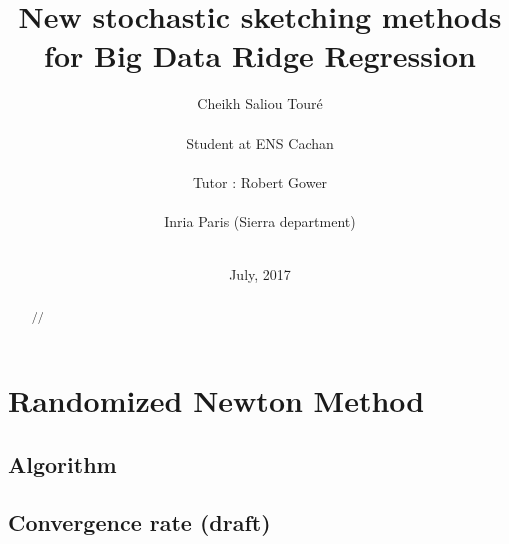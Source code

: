 




\title{New stochastic sketching methods for Big Data Ridge Regression}
\author{Cheikh Saliou Tour\'e \\ \\
Student at ENS Cachan\\\\
Tutor : Robert Gower \\ \\
Inria Paris (Sierra department)\\\\ }




\date{July, 2017}




\renewcommand\bibname{References}
\maketitle


\begin{abstract}

//

\end{abstract}
\tableofcontents
\newpage

\chapter{Randomized Newton Method}

%
%
%


\section{Algorithm}

\section{Convergence rate (draft)}




